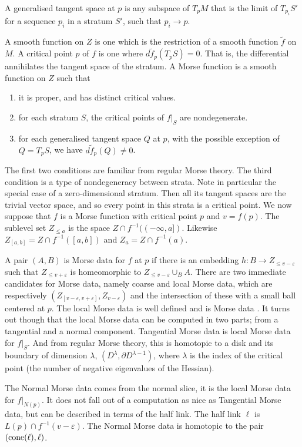 A generalised tangent space at $p$ is any subspace of $T_pM$ that is the limit of $T_{p_i}S'$ for a sequence $p_i$ in a stratum $S'$, such that $p_i \to p$.

A smooth function on $Z$ is one which is the restriction of a smooth function $\tilde f$ on $M$. A critical point $p$ of $f$ is one where $d\tilde f_p (T_p S) = 0$. That is, the differential annihilates the tangent space of the stratum. A Morse function is a smooth function on $Z$ such that
\begin{enumerate}
\item it is proper, and has distinct critical values.
\item for each stratum $S$, the critical points of $f|_S$ are nondegenerate.
\item for each generalised tangent space $Q$ at $p$, with the possible exception of $Q=T_pS$, we have $d\tilde f _p (Q) \neq 0$.
\end{enumerate}

The first two conditions are familiar from regular Morse theory. The third condition is a type of nondegeneracy between strata. Note in particular the special case of a zero-dimensional stratum. Then all its tangent spaces are the trivial vector space, and so every point in this strata is a critical point. We now suppose that $f$ is a Morse function with critical point $p$ and $v = f(p)$. The sublevel set $Z_{\leq a}$ is the space $Z \cap f^{-1}((-\infty,a])$. Likewise $Z_{[a,b]} = Z \cap f^{-1}([a,b])$ and $Z_a = Z \cap f^{-1}(a)$.

A pair $(A,B)$ is Morse data for $f$ at $p$ if there is an embedding $h : B \to Z_{\leq v-ε}$ such that $Z_{\leq v+ε}$ is homeomorphic to $Z_{\leq v-ε} \cup_B A$. There are two immediate candidates for Morse data, namely coarse and local Morse data, which are respectively $(Z_{[v-ε,v+ε]}, Z_{v-ε})$ and the intersection of these with a small ball centered at $p$. The local Morse data is well defined \cite[Prop 3.5.3]{Goresky1989} and is Morse data \cite[Thm 3.5.4]{Goresky1989}. It turns out though that the local Morse data can be computed in two parts; from a tangential and a normal component. Tangential Morse data is local Morse data for $f|_S$. And from regular Morse theory, this is homotopic to a disk and its boundary of dimension $λ$, $(D^λ, \partial D^{λ-1})$, where $λ$ is the index of the critical point (the number of negative eigenvalues of the Hessian).

The Normal Morse data comes from the normal slice, it is the local Morse data for $f|_{N(p)}$. It does not fall out of a computation as nice as Tangential Morse data, but can be described in terms of the half link. The half link $\ell$ is $L(p) \cap f^{-1}(v-ε)$. The Normal Morse data is homotopic to the pair $({\rm cone} (\ell), \ell)$.

